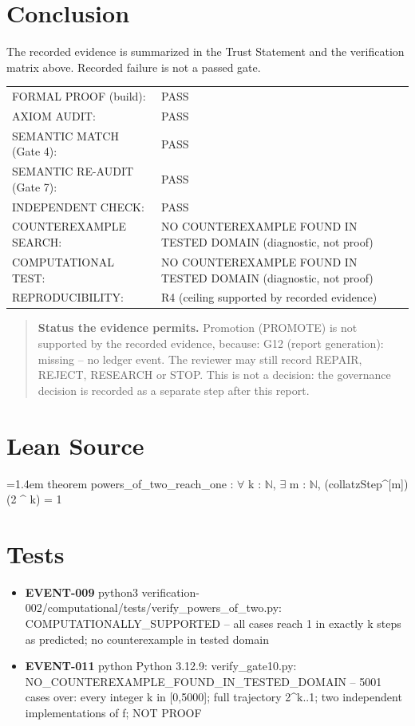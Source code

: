 \documentclass[11pt]{article}
\begin{document}
\section{Conclusion}
The recorded evidence is summarized in the Trust Statement and the verification matrix above. Recorded failure is not a passed gate.
\begin{center}\begin{tabular}{@{}p{}p{}@{}}
FORMAL PROOF (build): & PASS \\
AXIOM AUDIT: & PASS \\
SEMANTIC MATCH (Gate 4): & PASS \\
SEMANTIC RE-AUDIT (Gate 7): & PASS \\
INDEPENDENT CHECK: & PASS \\
COUNTEREXAMPLE SEARCH: & NO COUNTEREXAMPLE FOUND IN TESTED DOMAIN (diagnostic, not proof) \\
COMPUTATIONAL TEST: & NO COUNTEREXAMPLE FOUND IN TESTED DOMAIN (diagnostic, not proof) \\
REPRODUCIBILITY: & R4 (ceiling supported by recorded evidence) \\
\end{tabular}\end{center}
\begin{quote}\textbf{Status the evidence permits.} Promotion (PROMOTE) is not supported by the recorded evidence, because: G12 (report generation): missing -- no ledger event. The reviewer may still record REPAIR, REJECT, RESEARCH or STOP. This is not a decision: the governance decision is recorded as a separate step after this report.\end{quote}
\appendix
\section{Lean Source}
{\footnotesize\ttfamily\raggedright\hangindent=1.4em\noindent
\hspace*{0.00em}theorem powers\_\allowbreak{}of\_\allowbreak{}two\_\allowbreak{}reach\_\allowbreak{}one : \ensuremath{\forall} k : \ensuremath{\mathbb{N}}, \ensuremath{\exists} m : \ensuremath{\mathbb{N}}, (collatzStep\textasciicircum{}[m]) (2 \textasciicircum{} k) = 1\par
}

\section{Tests}
\begin{itemize}
\item \textbf{EVENT-009} python3 verification-002/computational/tests/verify\_powers\_of\_two.py: COMPUTATIONALLY\_SUPPORTED -- all cases reach 1 in exactly k steps as predicted; no counterexample in tested domain
\item \textbf{EVENT-011} python Python 3.12.9: verify\_gate10.py: NO\_COUNTEREXAMPLE\_FOUND\_IN\_TESTED\_DOMAIN -- 5001 cases over: every integer k in [0,5000]; full trajectory 2\textasciicircum{}k..1; two independent implementations of f; NOT PROOF
\end{itemize}
\end{document}
